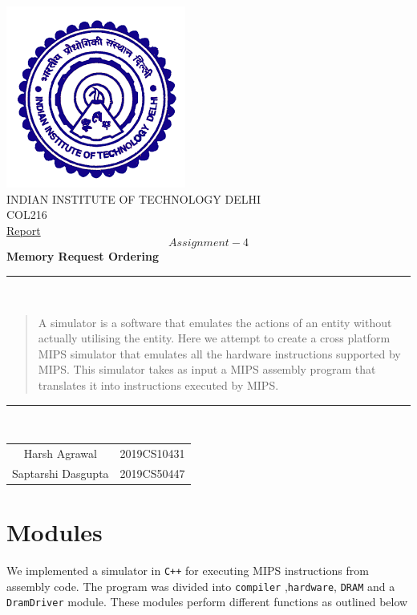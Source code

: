 \documentclass[hidelinks,12pt]{article}
\begin{document}
\begin{titlepage}
    \centering
    \includegraphics[scale=0.5]{../../logo.png}\\[1.0cm]
    \Large INDIAN INSTITUTE OF TECHNOLOGY DELHI\\[1.0 cm]
    \LARGE COL216\\[0.1cm]
    \Large \underline{Report}\\
    \large \[Assignment-4\]
    \LARGE \textbf{Memory Request Ordering}


    \rule{\textwidth}{0.2 mm} \\[0.1cm]
    \begin{abstract}
        A simulator is a software that emulates the actions of an entity without actually utilising the entity.
        Here we attempt to create a cross platform MIPS simulator that emulates all the hardware instructions supported by MIPS.
        This simulator takes as input a MIPS assembly program that translates it into instructions executed by MIPS.
        \\[0.1cm]
    \end{abstract}
    \rule{\textwidth}{0.2 mm} \\[0.1cm]
    \begin{flushright}

        \begin{tabular}{c|c}
            \small {Harsh Agrawal}      & \small {2019CS10431} \\
            \small {Saptarshi Dasgupta} & \small {2019CS50447} \\
        \end{tabular}
    \end{flushright}
\end{titlepage}
\tableofcontents
\newpage

\section{Modules}
We implemented a simulator in \verb|C++| for executing MIPS instructions from assembly code. The program was divided into \verb|compiler| ,\verb|hardware|, \verb|DRAM| and a \verb|DramDriver| module.
These modules perform different functions as outlined below
\end{document}

